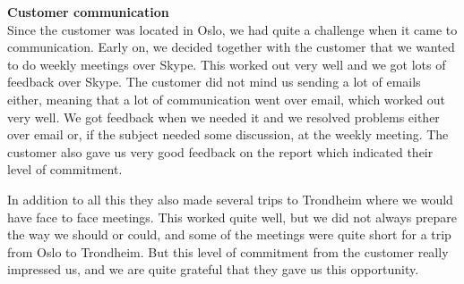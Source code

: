 \textbf{Customer communication} \\
Since the customer was located in Oslo, we had quite a challenge when it came to communication. Early on, we decided together with the customer that we wanted to do weekly meetings over Skype. This worked out very well and we got lots of feedback over Skype. The customer did not mind us sending a lot of emails either, meaning that a lot of communication went over email, which worked out very well. We got feedback when we needed it and we resolved problems either over email or, if the subject needed some discussion, at the weekly meeting. The customer also gave us very good feedback on the report which indicated their level of commitment. 

In addition to all this they also made several trips to Trondheim where we would have face to face meetings. This worked quite well, but we did not always prepare the way we should or could, and some of the meetings were quite short for a trip from Oslo to Trondheim. But this level of commitment from the customer really impressed us, and we are quite grateful that they gave us this opportunity.
\\

